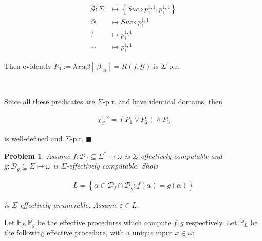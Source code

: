 \documentclass[a4paper, 12pt]{article}
\newtheorem{problem}{Problem}
\newtheorem{problem}{Problem}
\begin{document}
\begin{align*}
    \mathcal{G} : \Sigma &\mapsto \left\{ Suc \circ p_1^{1, 1}, p_1^{1, 1} \right\}  \\ 
    @ &\mapsto Suc \circ p_1^{1, 1} \\ 
    ? &\mapsto p_1^{1, 1} \\ 
    \sim &\mapsto p_1^{1, 1}
\end{align*}

Then evidently $P_3 := \lambda x\alpha\beta \left[ |\beta|_{@}  \right] = R(f,
\mathcal{G})$ is $\Sigma$-p.r. 

~ 

Since all these predicates are $\Sigma$-p.r. and have identical domains, then 

\begin{align*}
    \chi_S^{1, 2} = (P_1 \lor P_2) \land P_3
\end{align*}

is well-defined and $\Sigma$-p.r. $\blacksquare$

\pagebreak 

\begin{problem}
    Assume $f : \mathcal{D}_f \subseteq \Sigma^{*} \mapsto \omega$ is
    $\Sigma$-effectively computable and $g : \mathcal{D}_g \subseteq \Sigma
    \mapsto \omega$ is $\Sigma$-effectively computable. Show 

    \begin{align*}
        L = \left\{ \alpha \in \mathcal{D}_f \cap \mathcal{D}_g : f(\alpha) =
        g(\alpha) \right\} 
    \end{align*}

    is $\Sigma$-effectively enumerable. Assume $\varepsilon \in L$.
\end{problem}

Let $\mathbb{P}_f, \mathbb{P}_g$ be the effective procedures which compute $f,
g$ respectively. Let $\mathbb{P}_L$ be the following effective procedure, with a
unique input $x \in \omega$:
\end{document}
